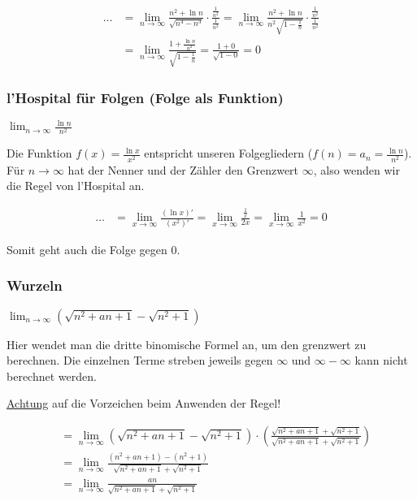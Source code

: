 \begin{align*}
\ldots &= \lim_{n \to \infty} \frac{n^2 + \ln n}{\sqrt{n^4 - n^3}}
\cdot \frac{\frac{1}{n^2}}{\frac{1}{n^2}} = \lim_{n \to \infty} \frac{n^2 + \ln
n}{n^2 \sqrt{1 - \frac{1}{n}}} \cdot \frac{\frac{1}{n^2}}{\frac{1}{n^2}} \\
&= \lim_{n \to \infty} \frac{1 + \frac{\ln n}{n^2}}{\sqrt{1 - \frac{1}{n}}}
= \frac{1 + 0}{\sqrt{1 - 0}} = 0
\end{align*}

\subsubsection{l'Hospital für Folgen (Folge als Funktion)}
$\lim_{n \to \infty} \frac{\ln n}{n^2}$

Die Funktion $f(x) = \frac{\ln x}{x^2}$ entspricht unseren Folgegliedern ($f(n)
= a_n = \frac{\ln n}{n^2}$). Für $n \to \infty$ hat der Nenner und der Zähler
den Grenzwert $\infty$, also wenden wir die Regel von l'Hospital an.

\begin{align*}
\ldots &= \lim_{x \to \infty} \frac{(\ln x)'}{(x^2)'} = \lim_{x \to \infty}
\frac{\frac{1}{x}}{2x} = \lim_{x \to \infty} \frac{1}{x^2} = 0
\end{align*}

Somit geht auch die Folge gegen 0.

\subsubsection{Wurzeln}
$\lim_{n \to \infty} (\sqrt{n^2 + an + 1} - \sqrt{n^2 + 1})$

Hier wendet man die dritte binomische Formel an, um den grenzwert zu berechnen.
Die einzelnen Terme streben jeweils gegen $\infty$ und $\infty - \infty$ kann
nicht berechnet werden.

\underline{Achtung} auf die Vorzeichen beim Anwenden der Regel!

\begin{align*}
&= \lim_{n \to \infty} (\sqrt{n^2 + an + 1} - \sqrt{n^2 + 1}) \cdot
\left(\frac{\sqrt{n^2 + an + 1} + \sqrt{n^2 + 1}}{\sqrt{n^2 + an + 1} +
\sqrt{n^2 + 1}} \right) \\
&= \lim_{n \to \infty} \frac{(n^2 + an + 1) - (n^2 + 1)}{\sqrt{n^2 + an + 1} +
\sqrt{n^2 + 1}} \\
&= \lim_{n \to \infty} \frac{an}{\sqrt{n^2 + an + 1} + \sqrt{n^2 + 1}} 
\end{align*}

